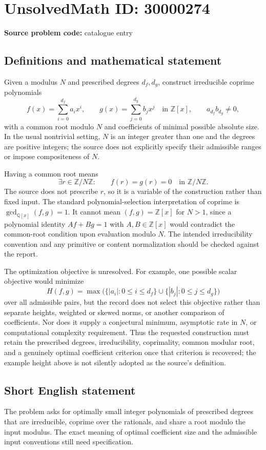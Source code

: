 \documentclass[11pt]{article}
\newcommand{\Z}{\mathbb{Z}}
\newcommand{\Q}{\mathbb{Q}}
\begin{document}
\section*{UnsolvedMath ID: 30000274}
\textbf{Source problem code:} catalogue entry
\subsection{Definitions and mathematical statement}
Given a modulus $N$ and prescribed degrees $d_f,d_g$, construct irreducible coprime polynomials
\[
 f(x)=\sum_{i=0}^{d_f}a_ix^i,\qquad
 g(x)=\sum_{j=0}^{d_g}b_jx^j\quad\text{in }\Z[x],
 \qquad a_{d_f}b_{d_g}\ne0,
\]
with a common root modulo $N$ and coefficients of minimal possible absolute size. In the usual nontrivial setting, $N$ is an integer greater than one and the degrees are positive integers; the source does not explicitly specify their admissible ranges or impose compositeness of $N$.

Having a common root means
\[
 \exists r\in\Z/N\Z:\qquad f(r)=g(r)=0\quad\text{in }\Z/N\Z.
\]
The source does not prescribe $r$, so it is a variable of the construction rather than fixed input. The standard polynomial-selection interpretation of coprime is $\gcd_{\Q[x]}(f,g)=1$. It cannot mean $(f,g)=\Z[x]$ for $N>1$, since a polynomial identity $Af+Bg=1$ with $A,B\in\Z[x]$ would contradict the common-root condition upon evaluation modulo $N$. The intended irreducibility convention and any primitive or content normalization should be checked against the report.

The optimization objective is unresolved. For example, one possible scalar objective would minimize
\[
 H(f,g)=\max\bigl(\{|a_i|:0\le i\le d_f\}\cup\{|b_j|:0\le j\le d_g\}\bigr)
\]
over all admissible pairs, but the record does not select this objective rather than separate heights, weighted or skewed norms, or another comparison of coefficients. Nor does it supply a conjectural minimum, asymptotic rate in $N$, or computational complexity requirement. Thus the requested construction must retain the prescribed degrees, irreducibility, coprimality, common modular root, and a genuinely optimal coefficient criterion once that criterion is recovered; the example height above is not silently adopted as the source's definition.
\subsection{Short English statement}
The problem asks for optimally small integer polynomials of prescribed degrees that are irreducible, coprime over the rationals, and share a root modulo the input modulus. The exact meaning of optimal coefficient size and the admissible input conventions still need specification.
\end{document}
